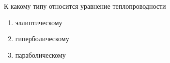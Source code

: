 К какому типу относится уравнение теплопроводности

\begin{enumerate}[label=\arabic*)]
    \item эллиптическому
    \item гиперболическому
    \item параболическому
\end{enumerate}

